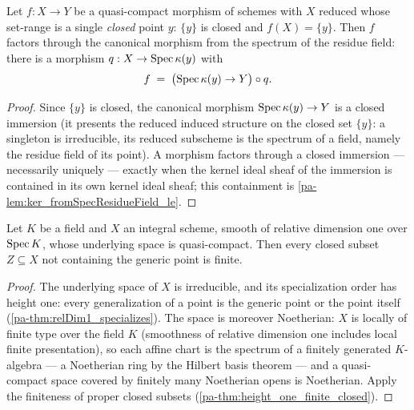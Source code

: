 \begin{theorem}
  \label{pa-thm:hom_factors_fromSpecResidueField}
  \leanok

  Let \(f : X \to Y\) be a quasi-compact morphism of schemes with \(X\) reduced whose
  set-range is a single \emph{closed} point \(y\): \(\{y\}\) is closed and
  \(f(X) = \{y\}\). Then \(f\) factors through the canonical morphism from the spectrum
  of the residue field: there is a morphism \(q : X \to \operatorname{Spec} \kappa(y)\) with
  \[
    f \;=\; \bigl(\operatorname{Spec} \kappa(y) \to Y\bigr) \circ q .
  \]
\end{theorem}
\begin{proof}
  \leanok
  Since \(\{y\}\) is closed, the canonical morphism \(\operatorname{Spec} \kappa(y) \to Y\) is a
  closed immersion (it presents the reduced induced structure on the closed set
  \(\{y\}\): a singleton is irreducible, its reduced subscheme is the spectrum of a
  field, namely the residue field of its point). A morphism factors through a closed
  immersion --- necessarily uniquely --- exactly when the kernel ideal sheaf of the
  immersion is contained in its own kernel ideal sheaf; this containment is
  \ref{pa-lem:ker_fromSpecResidueField_le}.
\end{proof}

\begin{theorem}
  \label{pa-thm:curve_finite_closed}
  \leanok

  Let \(K\) be a field and \(X\) an integral scheme, smooth of relative dimension one
  over \(\operatorname{Spec} K\), whose underlying space is quasi-compact. Then every closed subset
  \(Z \subseteq X\) not containing the generic point is finite.
\end{theorem}
\begin{proof}
  \leanok
  The underlying space of \(X\) is irreducible, and its specialization order has height
  one: every generalization of a point is the generic point or the point itself
  (\ref{pa-thm:relDim1_specializes}). The space is moreover Noetherian: \(X\) is locally of
  finite type over the field \(K\) (smoothness of relative dimension one includes local
  finite presentation), so each affine chart is the spectrum of a finitely generated
  \(K\)-algebra --- a Noetherian ring by the Hilbert basis theorem --- and a
  quasi-compact space covered by finitely many Noetherian opens is Noetherian. Apply
  the finiteness of proper closed subsets (\ref{pa-thm:height_one_finite_closed}).
\end{proof}

